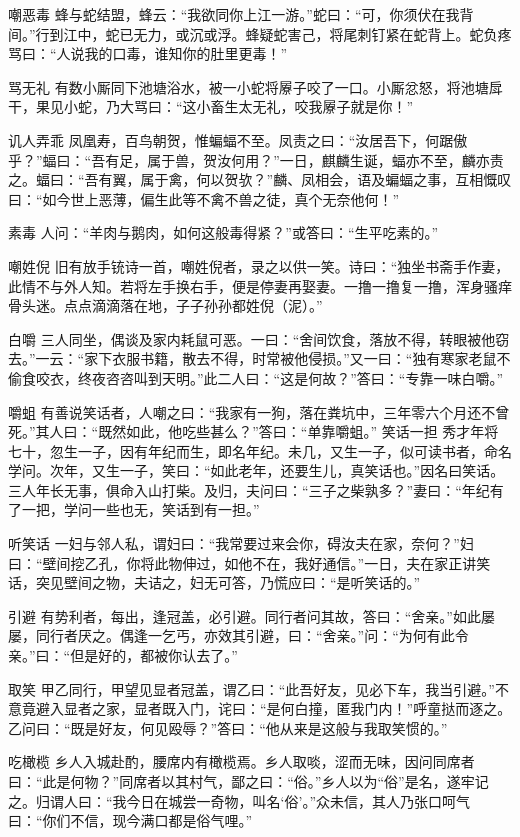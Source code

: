 \documentclass[12pt,UTF8]{ctexbook}
\begin{document}
嘲恶毒
蜂与蛇结盟，蜂云：“我欲同你上江一游。”蛇曰：“可，你须伏在我背间。”行到江中，蛇已无力，或沉或浮。蜂疑蛇害己，将尾刺钉紧在蛇背上。蛇负疼骂曰：“人说我的口毒，谁知你的肚里更毒！”

骂无礼
有数小厮同下池塘浴水，被一小蛇将屪子咬了一口。小厮忿怒，将池塘戽干，果见小蛇，乃大骂曰：“这小畜生太无礼，咬我屪子就是你！”

讥人弄乖
凤凰寿，百鸟朝贺，惟蝙蝠不至。凤责之曰：“汝居吾下，何踞傲乎？”蝠曰：“吾有足，属于兽，贺汝何用？”一日，麒麟生诞，蝠亦不至，麟亦责之。蝠曰：“吾有翼，属于禽，何以贺欤？”麟、凤相会，语及蝙蝠之事，互相慨叹曰：“如今世上恶薄，偏生此等不禽不兽之徒，真个无奈他何！”

素毒
人问：“羊肉与鹅肉，如何这般毒得紧？”或答曰：“生平吃素的。”

嘲姓倪
旧有放手铳诗一首，嘲姓倪者，录之以供一笑。诗曰：“独坐书斋手作妻，此情不与外人知。若将左手换右手，便是停妻再娶妻。一撸一撸复一撸，浑身骚痒骨头迷。点点滴滴落在地，子子孙孙都姓倪（泥）。”

白嚼
三人同坐，偶谈及家内耗鼠可恶。一曰：“舍间饮食，落放不得，转眼被他窃去。”一云：“家下衣服书籍，散去不得，时常被他侵损。”又一曰：“独有寒家老鼠不偷食咬衣，终夜咨咨叫到天明。”此二人曰：“这是何故？”答曰：“专靠一味白嚼。”

嚼蛆
有善说笑话者，人嘲之曰：“我家有一狗，落在粪坑中，三年零六个月还不曾死。”其人曰：“既然如此，他吃些甚么？”答曰：“单靠嚼蛆。”
笑话一担
秀才年将七十，忽生一子，因有年纪而生，即名年纪。未几，又生一子，似可读书者，命名学问。次年，又生一子，笑曰：“如此老年，还要生儿，真笑话也。”因名曰笑话。三人年长无事，俱命入山打柴。及归，夫问曰：“三子之柴孰多？”妻曰：“年纪有了一把，学问一些也无，笑话到有一担。”

听笑话
一妇与邻人私，谓妇曰：“我常要过来会你，碍汝夫在家，奈何？”妇曰：“壁间挖乙孔，你将此物伸过，如他不在，我好通信。”一日，夫在家正讲笑话，突见壁间之物，夫诘之，妇无可答，乃慌应曰：“是听笑话的。”

引避
有势利者，每出，逢冠盖，必引避。同行者问其故，答曰：“舍亲。”如此屡屡，同行者厌之。偶逢一乞丐，亦效其引避，曰：“舍亲。”问：“为何有此令亲。”曰：“但是好的，都被你认去了。”

取笑
甲乙同行，甲望见显者冠盖，谓乙曰：“此吾好友，见必下车，我当引避。”不意竟避入显者之家，显者既入门，诧曰：“是何白撞，匿我门内！”呼童挞而逐之。乙问曰：“既是好友，何见殴辱？”答曰：“他从来是这般与我取笑惯的。”

吃橄榄
乡人入城赴酌，腰席内有橄榄焉。乡人取啖，涩而无味，因问同席者曰：“此是何物？”同席者以其村气，鄙之曰：“俗。”乡人以为“俗”是名，遂牢记之。归谓人曰：“我今日在城尝一奇物，叫名‘俗’。”众未信，其人乃张口呵气曰：“你们不信，现今满口都是俗气哩。”
\end{document}
